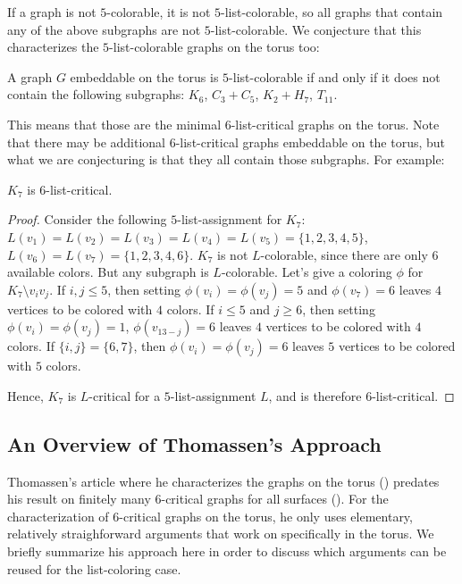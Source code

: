 If a graph is not $5$-colorable, it is not $5$-list-colorable, so all graphs 
that contain any of the above subgraphs are not $5$-list-colorable. 
We conjecture that this characterizes the $5$-list-colorable graphs on the torus too:

\begin{conjecture}
\label{torusconjecture}
A graph $G$ embeddable on the torus is $5$-list-colorable if and only if 
it does not contain the following subgraphs: $K_6$, $C_3 + C_5$, $K_2 + H_7$, $T_{11}$.
\end{conjecture}

This means that those are the minimal $6$-list-critical graphs on the torus. Note 
that there may be additional $6$-list-critical graphs embeddable on the torus, but what we are conjecturing is that they all 
contain those subgraphs. For example:

\begin{observation}
$K_7$ is $6$-list-critical.
\end{observation}

\begin{proof}
Consider the following $5$-list-assignment for $K_7$: $L(v_1) = L(v_2) = L(v_3) = L(v_4) = L(v_5) = \{1, 2, 3, 4, 5\}$, 
$L(v_6) = L(v_7) = \{1, 2, 3, 4, 6\}$. $K_7$ is not $L$-colorable, since there are only $6$ available colors. 
But any subgraph is $L$-colorable. Let's give a coloring $\phi$ for $K_7 \setminus v_iv_j$. If $i, j \leq 5$, 
then setting $\phi(v_i) = \phi(v_j) = 5$ and $\phi(v_7) = 6$ leaves $4$ vertices to be colored with $4$ colors. 
If $i \leq 5$ and $j \geq 6$, then setting $\phi(v_i) = \phi(v_j) = 1$, $\phi(v_{13-j}) = 6$ leaves $4$ vertices 
to be colored with $4$ colors. If $\{i, j\} = \{6, 7\}$, then $\phi(v_i) = \phi(v_j) = 6$ leaves $5$ vertices 
to be colored with $5$ colors.

Hence, $K_7$ is $L$-critical for a $5$-list-assignment $L$, and is therefore $6$-list-critical.
\end{proof}

\subsection{An Overview of Thomassen's Approach}

Thomassen's article where he characterizes the graphs on the torus (\cite{thomassentorus}) predates 
his result on finitely many $6$-critical graphs for all surfaces (\cite{thomassenfixedsurface}). 
For the characterization of $6$-critical graphs on the torus, he only uses elementary, relatively 
straighforward arguments that work on specifically in the torus. We briefly summarize his 
approach here in order to discuss which arguments can be reused for the list-coloring case. 

